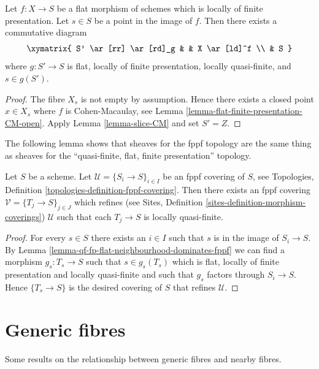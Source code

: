 \begin{lemma}
\label{lemma-qf-fp-flat-neighbourhood-dominates-fppf}
Let $f : X \to S$ be a flat morphism of schemes which is
locally of finite presentation. Let $s \in S$ be a point in the image of $f$.
Then there exists a commutative diagram
$$
\xymatrix{
S' \ar[rr] \ar[rd]_g & & X \ar[ld]^f \\
& S
}
$$
where $g : S' \to S$ is flat, locally of finite presentation,
locally quasi-finite, and $s \in g(S')$.
\end{lemma}

\begin{proof}
The fibre $X_s$ is not empty by assumption. Hence there exists a closed
point $x \in X_s$ where $f$ is Cohen-Macaulay, see
Lemma \ref{lemma-flat-finite-presentation-CM-open}.
Apply
Lemma \ref{lemma-slice-CM}
and set $S' = Z$.
\end{proof}

\noindent
The following lemma shows that sheaves for the fppf topology are
the same thing as sheaves for the
``quasi-finite, flat, finite presentation'' topology.

\begin{lemma}
\label{lemma-qf-fp-flat-dominates-fppf}
Let $S$ be a scheme. Let $\mathcal{U} = \{S_i \to S\}_{i \in I}$ be an fppf
covering of $S$, see
Topologies, Definition \ref{topologies-definition-fppf-covering}.
Then there exists an fppf covering $\mathcal{V} = \{T_j \to S\}_{j \in J}$
which refines (see
Sites, Definition \ref{sites-definition-morphism-coverings})
$\mathcal{U}$ such that each $T_j \to S$ is locally quasi-finite.
\end{lemma}

\begin{proof}
For every $s \in S$ there exists an $i \in I$ such that $s$ is in
the image of $S_i \to S$. By
Lemma \ref{lemma-qf-fp-flat-neighbourhood-dominates-fppf}
we can find a morphism $g_s : T_s \to S$ such that $s \in g_s(T_s)$
which is flat, locally of finite presentation and locally quasi-finite
and such that $g_s$ factors through $S_i \to S$. Hence
$\{T_s \to S\}$ is the desired covering of $S$ that refines $\mathcal{U}$.
\end{proof}



\section{Generic fibres}
\label{section-generic}

\noindent
Some results on the relationship between generic fibres and
nearby fibres.

